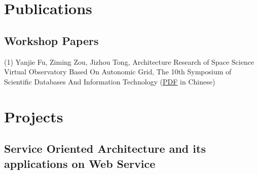 \documentclass[10pt,letterpaper]{article}
\renewenvironment{itemize}{
  \begin{list}{}{
    \setlength{\leftmargin}{1.5em}
    \setlength{\itemsep}{0.25em}
    \setlength{\parskip}{0pt}
    \setlength{\parsep}{0.25em}
  }
}{
  \end{list}
}
\begin{document}
\section*{Publications}
\subsection*{Workshop Papers}
\begin{itemize}
\item (1) Yanjie Fu, Ziming Zou, Jizhou Tong, Architecture Research of Space Science Virtual Observatory Based On Autonomic Grid, The 10th Symposium of Scientific Databases And Information Technology (\href{http://sites.google.com/site/pipifuyj/documents/ArchitectureResearchofSpaceScienceVirtualObservatoryBasedOnAutonomicGrid.pdf?attredirects=0&d=1}{\underline {PDF}} in Chinese)
\end{itemize}

\section*{Projects}

\subsection*{Service Oriented Architecture and its applications on Web Service}
\end{document}
